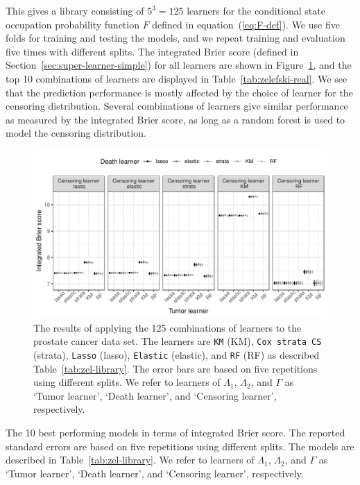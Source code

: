 \documentclass{statsoc}
\numberwithin{theorem}{section}
\newcommand{\1}{\mathds{1}}
\begin{document}
This gives a library consisting of \( 5^3 = 125 \) learners for the conditional
state occupation probability function \( F \) defined in
equation~(\ref{eq:F-def}). We use five folds for training and testing the
models, and we repeat training and evaluation five times with different splits.
The integrated Brier score (defined in Section~\ref{sec:super-learner-simple})
for all learners are shown in Figure~\ref{fig:zelefski-real}, and the top 10
combinations of learners are displayed in Table~\ref{tab:zelefski-real}. We see
that the prediction performance is mostly affected by the choice of learner for
the censoring distribution. Several combinations of learners give similar
performance as measured by the integrated Brier score, as long as a random
forest is used to model the censoring distribution.

\begin{figure}
  \centerline{\includegraphics[width=1\linewidth]{./zelefski-real-data.pdf}}
  \caption[]{The results of applying the 125 combinations of learners to the
    prostate cancer data set. The learners are \texttt{KM} (KM), \texttt{Cox
      strata CS} (strata), \texttt{Lasso} (lasso), \texttt{Elastic} (elastic),
    and \texttt{RF} (RF) as described Table~\ref{tab:zel-library}. The error
    bars are based on five repetitions using different splits. We refer to
    learners of \( \Lambda_1 \), \( \Lambda_2 \), and $\Gamma$ as `Tumor
    learner', `Death learner', and `Censoring learner', respectively.}
  \label{fig:zelefski-real}
\end{figure}


\begin{table}
  \caption{\label{tab:zelefski-real}The 10 best performing models in terms of integrated Brier score. The
    reported standard errors are based on five repetitions using different
    splits. The models are described in Table~\ref{tab:zel-library}. We refer to
    learners of \( \Lambda_1 \), \( \Lambda_2 \), and $\Gamma$ as `Tumor
    learner', `Death learner', and `Censoring learner', respectively.}
  \centering
  
\end{table}
\end{document}
